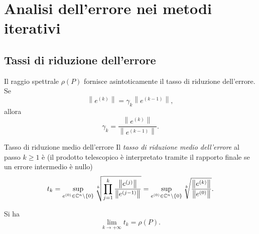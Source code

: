 \documentclass[a4paper]{article}
\newcommand{\norm}[1]{\left\lVert#1\right\rVert}
\begin{document}
\section{Analisi dell'errore nei metodi iterativi}

\subsection{Tassi di riduzione dell'errore}

Il raggio spettrale \(\rho(P)\) fornisce asintoticamente il tasso di riduzione dell'errore. Se
\[
    \norm{e^{(k)}}=\gamma_k\norm{e^{(k-1)}},
\]
allora
\[
    \gamma_k
    =
    \frac{\norm{e^{(k)}}}{\norm{e^{(k-1)}}}.
\]

\begin{snippetdefinition}{Tasso di riduzione medio dell'errore}
    Il \emph{tasso di riduzione medio dell'errore} al passo \(k\geq 1\) è (il prodotto telescopico è interpretato tramite il rapporto finale se un errore intermedio è nullo)
    \[
        t_k
        =
        \sup_{e^{(0)}\in\complexnumbers^n\setminus\{0\}}
        \sqrt[k]{
            \prod_{j=1}^k
            \frac{\norm{e^{(j)}}}{\norm{e^{(j-1)}}}
        }
        =
        \sup_{e^{(0)}\in\complexnumbers^n\setminus\{0\}}
        \sqrt[k]{
            \frac{\norm{e^{(k)}}}{\norm{e^{(0)}}}
        }.
    \]
\end{snippetdefinition}

\begin{snippettheorem}{}
    Si ha
    \[
        \lim_{k\to+\infty}t_k=\rho(P).
    \]
\end{snippettheorem}
\end{document}
